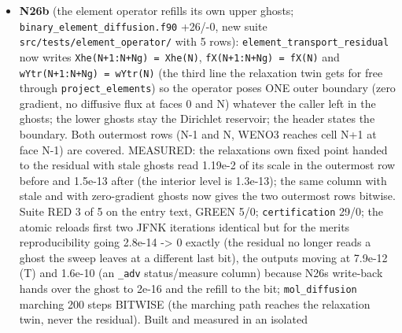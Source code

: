 \documentclass[english,a4paper]{my_memo}
\begin{document}
\begin{itemize}
  ghost and reads 1.19e-2 in both arms); \texttt{krylov\_and\_dogleg} 174/0. Advisor:
  rebuild warning-free, \texttt{steady\_newton.o} md5 \texttt{4bd3138a} and binary
  \texttt{e56609ff} identical to the worker\textquotesingle s, 174/0 and 189/0 on \texttt{build\_lwv}; one
  \texttt{neighbors} fixed. \textbf{Reported, the next small item (N26b)}: the
  relaxation solvers \texttt{solve\_trace\_element\_in\_hydrogen} and
  \texttt{element\_diffusion\_step} refill their working arrays\textquotesingle{} upper ghosts before
  every pass while \texttt{element\_transport\_residual}, documented as the same
  operator, reads the ghost from \texttt{f\_sp} with no refill, so the operator\textquotesingle s
  boundary depends on its caller (\texttt{binary\_element\_diffusion.f90}, two lines).
  Not claimed: convergence; an explanation of the collapse of the outermost
  cells to 1e-11 of the reservoir.
\item
  \textbf{N26b} (the element operator refills its own upper ghosts;
  \texttt{binary\_element\_diffusion.f90} +26/-0, new suite \texttt{src/tests/element\_operator/}
  with 5 rows): \texttt{element\_transport\_residual} now writes \texttt{Xhe(N+1:N+Ng)\ =\ Xhe(N)}, \texttt{fX(N+1:N+Ng)\ =\ fX(N)} and \texttt{wYtr(N+1:N+Ng)\ =\ wYtr(N)} (the third
  line the relaxation twin gets for free through \texttt{project\_elements}) so the
  operator poses ONE outer boundary (zero gradient, no diffusive flux at
  faces 0 and N) whatever the caller left in the ghosts; the lower ghosts
  stay the Dirichlet reservoir; the header states the boundary. Both
  outermost rows (N-1 and N, WENO3 reaches cell N+1 at face N-1) are covered.
  MEASURED: the relaxation\textquotesingle s own fixed point handed to the residual with
  stale ghosts read 1.19e-2 of its scale in the outermost row before and
  1.5e-13 after (the interior level is 1.3e-13); the same column with stale
  and with zero-gradient ghosts now gives the two outermost rows bitwise.
  Suite RED 3 of 5 on the entry text, GREEN 5/0; \texttt{certification} 29/0; the
  atomic reload\textquotesingle s first two JFNK iterations identical but for the merit\textquotesingle s
  reproducibility going 2.8e-14 -\textgreater{} 0 exactly (the residual no longer reads
  a ghost the sweep leaves at a different last bit), the outputs moving at
  7.9e-12 (T) and 1.6e-10 (an \texttt{\_adv} status/measure column) because N26\textquotesingle s
  write-back hands over the ghost to 2e-16 and the refill to the bit;
  \texttt{mol\_diffusion} marching 200 steps BITWISE (the marching path reaches the
  relaxation twin, never the residual). Built and measured in an isolated

\end{itemize}
\end{document}

